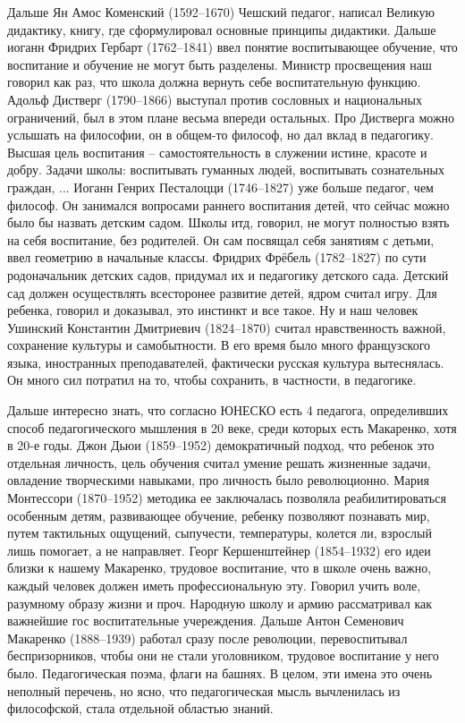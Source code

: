 \documentclass[a4paper, 12pt]{article}
\begin{document}
Дальше Ян Амос Коменский (1592--1670) Чешский педагог, написал Великую 
дидактику, книгу, где сформулировал основные принципы дидактики. Дальше 
иоганн Фридрих Гербарт (1762--1841) ввел понятие воспитывающее обучение, 
что воспитание и обучение не могут быть разделены. Министр просвещения 
наш говорил как раз, что школа должна вернуть себе воспитательную 
функцию. Адольф Дистверг (1790--1866) выступал против сословных 
и национальных ограничений, был в этом плане весьма впереди остальных. 
Про Дистверга можно услышать на философии, он в общем-то философ, но дал 
вклад в педагогику. Высшая цель воспитания -- самостоятельность 
в служении истине, красоте и добру. Задачи школы: воспитывать гуманных 
людей, воспитывать сознательных граждан, ... Иоганн Генрих Песталоцци 
(1746--1827) уже больше педагог, чем философ. Он занимался вопросами 
раннего воспитания детей, что сейчас можно было бы назвать детским 
садом. Школы итд, говорил, не могут полностью взять на себя воспитание, 
без родителей. Он сам посвящал себя занятиям с детьми, ввел геометрию 
в начальные классы. Фридрих Фрёбель (1782--1827) по сути родоначальник 
детских садов, придумал их и педагогику детского сада. Детский сад 
должен осуществлять всесторонее развитие детей, ядром считал игру. Для 
ребенка, говорил и доказывал, это инстинкт и все такое. Ну и наш человек 
Ушинский Константин Дмитриевич (1824--1870) считал нравственность 
важной, сохранение культуры и самобытности. В его время было много 
французского языка, иностранных преподавателей, фактически русская 
культура вытеснялась. Он много сил потратил на то, чтобы сохранить, 
в частности, в педагогике.

Дальше интересно знать, что согласно ЮНЕСКО есть 4 педагога, 
определивших способ педагогического мышления в 20 веке, среди которых 
есть Макаренко, хотя в 20-е годы. Джон Дьюи (1859--1952) демократичный 
подход, что ребенок это отдельная личность, цель обучения считал умение 
решать жизненные задачи, овладение творческими навыками, про личность 
было революционно. Мария Монтессори (1870--1952) методика ее заключалась 
позволяла реабилитироваться особенным детям, развивающее обучение, 
ребенку позволяют познавать мир, путем тактильных ощущений, сыпучести, 
температуры, колется ли, взрослый лишь помогает, а не направляет. Георг 
Кершенштейнер (1854--1932) его идеи близки к нашему Макаренко, трудовое 
воспитание, что в школе очень важно, каждый человек должен иметь 
профессиональную эту. Говорил учить воле, разумному образу жизни и проч. 
Народную школу и армию рассматривал как важнейшие гос воспитательные 
учереждения. Дальше Антон Семенович Макаренко (1888--1939) работал сразу 
после революции, перевоспитывал беспризорников, чтобы они не стали 
уголовником, трудовое воспитание у него было. Педагогическая поэма, 
флаги на башнях. В целом, эти имена это очень неполный перечень, но 
ясно, что педагогическая мысль вычленилась из философской, стала 
отдельной областью знаний.
\end{document}
